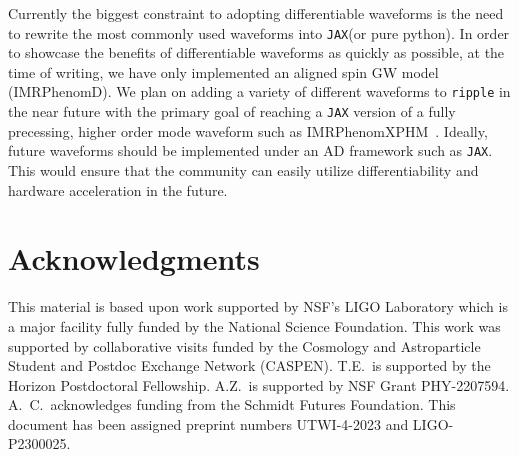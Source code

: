\documentclass[twocolumn]{aastex631}
\newcommand{\jax}{\texttt{JAX}\xspace}
\newcommand{\ripple}{\texttt{ripple}\xspace}
\newcommand{\mi}[1]{\textbf{\color{teal}(MI: #1)}}
\newcommand{\amc}[1]{{\color{red}[AC: #1]}}
\begin{document}
Currently the biggest constraint to adopting differentiable waveforms is the need to rewrite the most commonly used waveforms into \jax (or pure python).
In order to showcase the benefits of differentiable waveforms as quickly as possible, at the time of writing, we have only implemented an aligned spin GW model (IMRPhenomD).
We plan on adding a variety of different waveforms to \ripple in the near future with the primary goal of reaching a \jax version of a fully precessing, higher order mode waveform such as IMRPhenomXPHM~\citep{Pratten:2020ceb}.
Ideally, future waveforms should be implemented under an AD framework such as \jax.
This would ensure that the community can easily utilize differentiability and hardware acceleration in the future.


\section{Acknowledgments}
This material is based upon work supported by NSF's LIGO Laboratory which is a major facility fully funded by the National Science Foundation.
This work was supported by collaborative visits funded by the Cosmology and Astroparticle Student and Postdoc Exchange Network (CASPEN). 
T.E.\ is supported by the Horizon Postdoctoral Fellowship.
A.Z.~is supported by NSF Grant PHY-2207594.
A.~C.\ acknowledges funding from the Schmidt Futures Foundation.
This document has been assigned preprint numbers UTWI-4-2023 and LIGO-P2300025.


\end{document}
